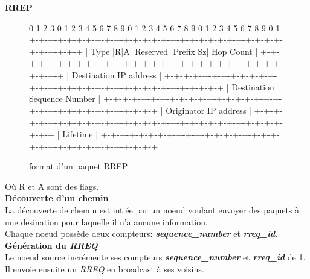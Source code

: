 \documentclass[a4paper, 12pt]{report}
\begin{document}
        \textbf{RREP}
        \begin{figure}[H]
            \centering
                \begin{verbatimtab}
 0                   1                   2                   3
 0 1 2 3 4 5 6 7 8 9 0 1 2 3 4 5 6 7 8 9 0 1 2 3 4 5 6 7 8 9 0 1
+-+-+-+-+-+-+-+-+-+-+-+-+-+-+-+-+-+-+-+-+-+-+-+-+-+-+-+-+-+-+-+-+
|     Type      |R|A|    Reserved     |Prefix Sz|   Hop Count   |
+-+-+-+-+-+-+-+-+-+-+-+-+-+-+-+-+-+-+-+-+-+-+-+-+-+-+-+-+-+-+-+-+
|                     Destination IP address                    |
+-+-+-+-+-+-+-+-+-+-+-+-+-+-+-+-+-+-+-+-+-+-+-+-+-+-+-+-+-+-+-+-+
|                  Destination Sequence Number                  |
+-+-+-+-+-+-+-+-+-+-+-+-+-+-+-+-+-+-+-+-+-+-+-+-+-+-+-+-+-+-+-+-+
|                    Originator IP address                      |
+-+-+-+-+-+-+-+-+-+-+-+-+-+-+-+-+-+-+-+-+-+-+-+-+-+-+-+-+-+-+-+-+
|                           Lifetime                            |
+-+-+-+-+-+-+-+-+-+-+-+-+-+-+-+-+-+-+-+-+-+-+-+-+-+-+-+-+-+-+-+-+
                \end{verbatimtab}
            \caption{format d'un paquet RREP \cite{aodv_w}}
            \label{rreqPaquet}
        \end{figure}

        Où R et A sont des flags.\\

        \underline{\textbf{Découverte d'un chemin}}\\
        La découverte de chemin est intiée par un noeud voulant envoyer des paquets à une desination pour laquelle il n'a aucune information.\\
        Chaque noeud possède deux compteurs: \textbf{\textit{sequence\_number}} et \textbf{\textit{rreq\_id}}.\\
        
        \textbf{Génération du \textit{RREQ}}\\
            Le noeud source incrémente ses compteurs \textbf{\textit{sequence\_number}} et \textbf{\textit{rreq\_id}} de 1.
            Il envoie ensuite un \textit{RREQ} en broadcast à ses voisins.\\
        
\end{document}
